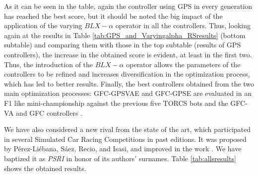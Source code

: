 \documentclass[10pt,journal,compsoc]{IEEEtran}
\begin{document}
As it can be seen in the table, again the controller using GPS in
every generation has reached the best score, but it should be noted the
big impact of the application of the varying $BLX-\alpha$ operator in
all the controllers. Thus, looking again at the results in Table \ref{tab:GPS_and_Varyingalpha_RSresults} (bottom subtable) 
and comparing them with those in the top subtable (results of GPS controllers), the increase in the obtained score is evident, at least in the first
two. 
Thus, the introduction of the $BLX-\alpha$ operator allows the parameters of the controllers to be refined and increases diversification in the optimization process, which has led to better results.
Finally, the best controllers obtained from the two main optimization
processes: {\sf GFC-GPSVAE} and {\sf GFC-GPSE} are evaluated in an F1 like mini-championship against the previous five TORCS bots and the {\sf GFC-VA}\cite{DBLP:conf/cig/SalemMG19} and {\sf GFC} controllers  \cite{salem_cig2018}. 



We have also considered a new rival from the state of the art, which participated in several Simulated Car Racing Competitions in past editions. 
It was proposed by P{\'e}rez-Li{\'e}bana, S{\'a}ez, Recio, and Isasi, and improved in the work \cite{PerezEvolvingFuzzy09}. We have baptized it as \textit{PSRI} in honor of its authors' surnames. 
Table \ref{tab:allsresults} shows the obtained results.
%
\end{document}
